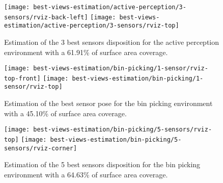 \begin{figure}
	\centering
	\texttt{[image: best-views-estimation/active-perception/3-sensors/rviz-back-left]}%
	\texttt{[image: best-views-estimation/active-perception/3-sensors/rviz-top]}
	\caption{Estimation of the 3 best sensors disposition for the active perception environment with a 61.91\% of surface area coverage.}
	\label{fig:active-perception-3-sensors}
\end{figure}

\begin{figure}
	\centering
	\texttt{[image: best-views-estimation/bin-picking/1-sensor/rviz-top-front]}%
	\texttt{[image: best-views-estimation/bin-picking/1-sensor/rviz-top]}
	\caption{Estimation of the best sensor pose for the bin picking environment with a 45.10\% of surface area coverage.}
	\label{fig:bin-picking-1-sensor}
\end{figure}

\begin{figure}
	\centering
	\texttt{[image: best-views-estimation/bin-picking/5-sensors/rviz-top]}%
	\texttt{[image: best-views-estimation/bin-picking/5-sensors/rviz-corner]}%
	\caption{Estimation of the 5 best sensors disposition for the bin picking environment with a 64.63\% of surface area coverage.}
	\label{fig:bin-picking-5-sensors}
\end{figure}

